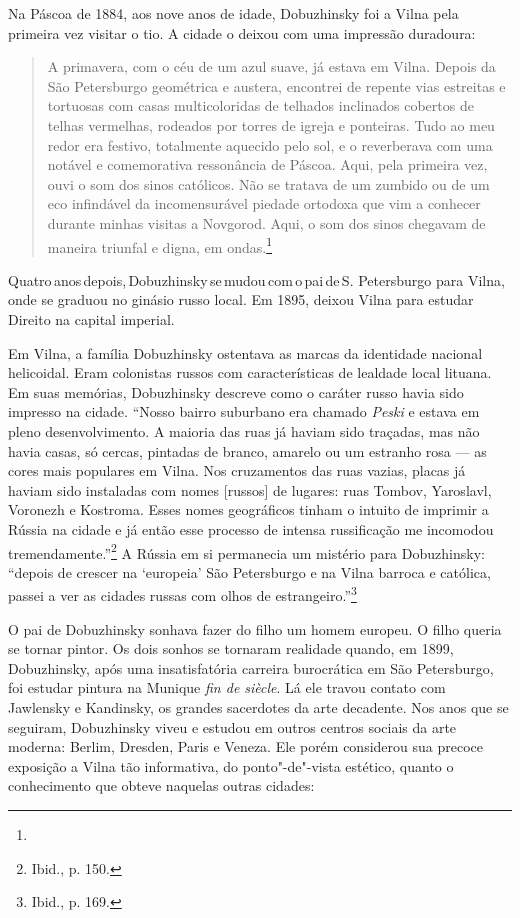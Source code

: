 Na Páscoa de 1884, aos nove anos de idade, Dobuzhinsky foi a Vilna pela
primeira vez visitar o tio. A cidade o deixou com uma impressão
duradoura:

\begin{quote}
A primavera, com o céu de um azul suave, já estava em Vilna. Depois da
São Petersburgo geométrica e austera, encontrei de repente vias
estreitas e tortuosas com casas multicoloridas de telhados inclinados
cobertos de telhas vermelhas, rodeados por torres de igreja e ponteiras.
Tudo ao meu redor era festivo, totalmente aquecido pelo sol, e o
reverberava com uma notável e comemorativa ressonância de Páscoa. Aqui,
pela primeira vez, ouvi o som dos sinos católicos. Não se tratava de um
zumbido ou de um eco infindável da incomensurável piedade ortodoxa que
vim a conhecer durante minhas visitas a Novgorod. Aqui, o som dos sinos
chegavam de maneira triunfal e digna, em ondas.\footnote{} 
\end{quote}


Quatro\,anos\,depois,\,Dobuzhinsky\,se\,mudou\,com\,o\,pai\,de\,S. Petersburgo %
para Vilna, onde se graduou no ginásio russo local. Em 1895, deixou
Vilna para estudar Direito na capital imperial.

Em Vilna, a família Dobuzhinsky ostentava as marcas da identidade
nacional helicoidal. Eram colonistas russos com características de
lealdade local lituana. Em suas memórias, Dobuzhinsky descreve como o
caráter russo havia sido impresso na cidade. ``Nosso bairro suburbano
era chamado \textit{Peski} e estava em pleno desenvolvimento. A maioria
das ruas já haviam sido traçadas, mas não havia casas, só cercas,
pintadas de branco, amarelo ou um estranho rosa --- as cores mais
populares em Vilna. Nos cruzamentos das ruas vazias, placas já haviam
sido instaladas com nomes {[}russos{]} de lugares: ruas Tombov,
Yaroslavl, Voronezh e Kostroma. Esses nomes geográficos tinham o intuito
de imprimir a Rússia na cidade e já então esse processo de intensa
russificação me incomodou tremendamente.''\footnote{Ibid., p. 150.} A
Rússia em si permanecia um mistério para Dobuzhinsky: ``depois de
crescer na `europeia' São Petersburgo e na Vilna barroca e católica,
passei a ver as cidades russas com olhos de estrangeiro.''\footnote{Ibid., p. 169.}

O pai de Dobuzhinsky sonhava fazer do filho um homem europeu. O filho
queria se tornar pintor. Os dois sonhos se tornaram realidade quando, em
1899, Dobuzhinsky, após uma insatisfatória carreira burocrática em São
Petersburgo, foi estudar pintura na Munique \textit{fin de siècle}. Lá ele
travou contato com Jawlensky e Kandinsky, os grandes sacerdotes da arte
decadente. Nos anos que se seguiram, Dobuzhinsky viveu e estudou em
outros centros sociais da arte moderna: Berlim, Dresden, Paris e Veneza.
Ele porém considerou sua precoce exposição a Vilna tão informativa, do
ponto"-de"-vista estético, quanto o conhecimento que obteve naquelas
outras cidades:

